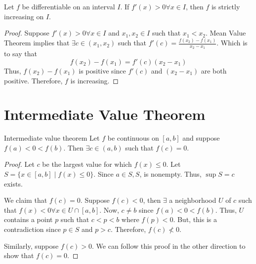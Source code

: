 \begin{theorem}
    Let $f$ be differentiable on an interval $I$. If $f'(x) > 0 \forall x \in I$, then $f$ is strictly increasing on $I$.
\end{theorem}
\begin{proof}
    Suppose $f'(x) > 0 \forall x \in I$ and $x_1, x_2 \in I$ such that $x_1 < x_2$. Mean Value Theorem implies that $\exists c \in (x_1, x_2)$ such that $f'(c) = \frac{f(x_2) - f(x_1)}{x_2 - x_1}$. Which is to say that $$f(x_2) - f(x_1) = f'(c) (x_2 - x_1)$$ Thus, $f(x_2) - f(x_1)$ is positive since $f'(c)$ and $(x_2 - x_1)$ are both positive. Therefore, $f$ is increasing.
\end{proof}

\section{Intermediate Value Theorem}
\begin{theorem}{Intermediate value theorem}{}
    Let $f$ be continuous on $[a,b]$ and suppose $f(a) < 0 < f(b)$. Then $\exists c \in (a,b)$ such that $f(c) = 0$.
\end{theorem}
\begin{proof}
    Let $c$ be the largest value for which $f(x) \leq 0$. Let $S = \{x \in [a, b] \mid f(x) \leq 0\}$. Since $a \in S, S$, is nonempty. Thus, $\sup S = c$ exists.

    We claim that $f(c) = 0$. Suppose $f(c) < 0$, then $\exists$ a neighborhood $U$ of $c$ such that $f(x) < 0 \forall x \in U \cap [a, b]$. Now, $c \neq b$ since $f(a) < 0 < f(b)$. Thus, $U$ contains a point $p$ such that $c < p < b$ where $f(p) < 0$. But, this is a contradiction since $p \in S$ and $p > c$. Therefore, $f(c) \not< 0$.

    Similarly, suppose $f(c) > 0$. We can follow this proof in the other direction to show that $f(c) = 0$.
\end{proof}